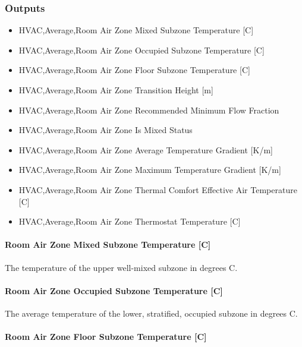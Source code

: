\subsubsection{Outputs}\label{roomairsettingsthreenodedisplacementventilation-outputs}

\begin{itemize}
\item
  HVAC,Average,Room Air Zone Mixed Subzone Temperature {[}C{]}
\item
  HVAC,Average,Room Air Zone Occupied Subzone Temperature {[}C{]}
\item
  HVAC,Average,Room Air Zone Floor Subzone Temperature {[}C{]}
\item
  HVAC,Average,Room Air Zone Transition Height {[}m{]}
\item
  HVAC,Average,Room Air Zone Recommended Minimum Flow Fraction
\item
  HVAC,Average,Room Air Zone Is Mixed Status
\item
  HVAC,Average,Room Air Zone Average Temperature Gradient {[}K/m{]}
\item
  HVAC,Average,Room Air Zone Maximum Temperature Gradient {[}K/m{]}
\item
  HVAC,Average,Room Air Zone Thermal Comfort Effective Air Temperature {[}C{]}
\item
  HVAC,Average,Room Air Zone Thermostat Temperature {[}C{]}
\end{itemize}

\paragraph{Room Air Zone Mixed Subzone Temperature {[}C{]}}\label{room-air-zone-mixed-subzone-temperature-c}

The temperature of the upper well-mixed subzone in degrees C.

\paragraph{Room Air Zone Occupied Subzone Temperature {[}C{]}}\label{room-air-zone-occupied-subzone-temperature-c}

The average temperature of the lower, stratified, occupied subzone in degrees C.

\paragraph{Room Air Zone Floor Subzone Temperature {[}C{]}}\label{room-air-zone-floor-subzone-temperature-c}

